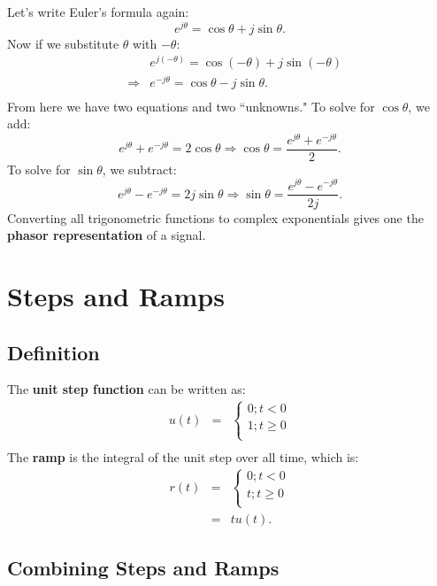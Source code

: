 \documentclass[11pt]{article}
\begin{document}
Let's write Euler's formula again:
\[e^{j\theta} = \cos{\theta} + j\sin{\theta}.\]
Now if we substitute $\theta$ with $-\theta$:
\begin{eqnarray*}
& & e^{j(-\theta)} = \cos{(-\theta)} + j\sin{(-\theta)}\\
& \Longrightarrow & e^{-j\theta} = \cos{\theta} - j\sin{\theta}.\\
\end{eqnarray*}
From here we have two equations and two ``unknowns." To solve for $\cos{\theta}$, we add:
\[ e^{j\theta} + e^{-j\theta} = 2\cos{\theta} \Longrightarrow \boxed{ \cos{\theta} = \frac{ e^{j\theta} + e^{-j\theta}}{2}. } \]
To solve for $\sin{\theta}$, we subtract:
\[ e^{j\theta} - e^{-j\theta} = 2j\sin{\theta} \Longrightarrow \boxed{ \sin{\theta} = \frac{ e^{j\theta} - e^{-j\theta}}{2j}.} \]
Converting all trigonometric functions to complex exponentials gives one the {\bf phasor representation} of a signal.

\section{Steps and Ramps}

\subsection{Definition}

The {\bf unit step function} can be written as:
\begin{eqnarray*}
u(t) &=& \left\{
	\begin{array}{lr}
	0; t < 0 \\
	1; t \geq 0 \\
	\end{array} \right. \\
\end{eqnarray*}
The {\bf ramp} is the integral of the unit step over all time, which is:
\begin{eqnarray*}
r(t) &=& \left\{
	\begin{array}{lr}
	0; t < 0 \\
	t; t \geq 0 \\
	\end{array} \right. \\
&=& tu(t).
\end{eqnarray*}

\subsection{Combining Steps and Ramps}
\end{document}
